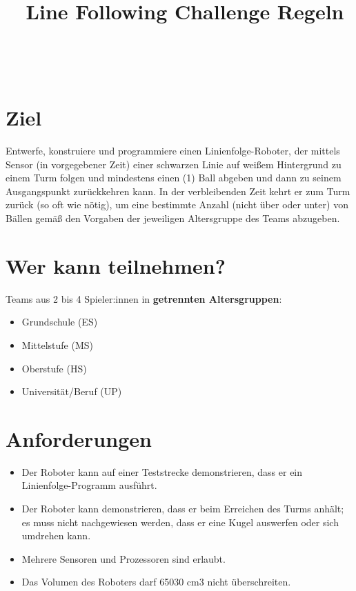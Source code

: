 \documentclass[a4paper,12pt]{article}
\begin{document}



\title{\tagYear\ Line Following Challenge Regeln}
\makeatletter
\let\inserttitle\@title
\makeatother
\begin{center}
	\rrgerLogo
	\huge                      %
	\bfseries                   %
	\\
	\inserttitle
\end{center}

\section{Ziel}
Entwerfe, konstruiere und programmiere einen Linienfolge-Roboter, der mittels
Sensor (in vorgegebener Zeit) einer schwarzen Linie auf weißem Hintergrund zu
einem Turm folgen und mindestens einen (1) Ball abgeben und dann zu seinem
Ausgangspunkt zurückkehren kann. In der verbleibenden Zeit kehrt er zum Turm
zurück (so oft wie nötig), um eine bestimmte Anzahl (nicht über oder unter) von
Bällen gemäß den Vorgaben der jeweiligen Altersgruppe des Teams abzugeben.

\section{Wer kann teilnehmen?}

Teams aus 2 bis 4 Spieler:innen in \textbf{getrennten Altersgruppen}:
\begin{itemize}
	\item Grundschule (ES)
	\item Mittelstufe (MS)
	\item Oberstufe (HS)
	\item Universität/Beruf (UP)
\end{itemize}
\combineDivisions

\section{Anforderungen}
\robotRequirements
\begin{itemize}
	\item Der Roboter kann auf einer Teststrecke demonstrieren, dass er
		ein Linienfolge-Programm ausführt.
	\item Der Roboter kann demonstrieren, dass er beim Erreichen des Turms
		anhält; es muss nicht nachgewiesen werden, dass er eine Kugel
		auswerfen oder sich umdrehen kann.
	\item Mehrere Sensoren und Prozessoren sind erlaubt.
	\item Das Volumen des Roboters darf 65030 cm3 nicht überschreiten.
\end{itemize}
\end{document}
